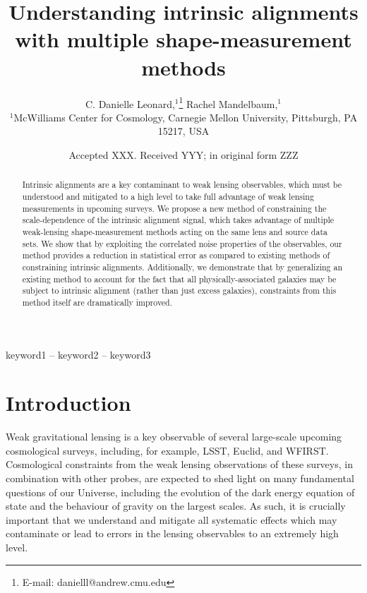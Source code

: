 \documentclass[a4paper,fleqn,usenatbib]{mnras}
\title[]{Understanding intrinsic alignments with multiple shape-measurement methods}
\author[C. D. Leonard et al.]{
C. Danielle Leonard,$^{1}$\thanks{E-mail: danielll@andrew.cmu.edu}
Rachel Mandelbaum,$^{1}$
\\
$^{1}$McWilliams Center for Cosmology, Carnegie Mellon University, Pittsburgh, PA 15217, USA
}
\date{Accepted XXX. Received YYY; in original form ZZZ}
\begin{document}
\label{firstpage}
\pagerange{\pageref{firstpage}--\pageref{lastpage}}
\maketitle

\begin{abstract}
Intrinsic alignments are a key contaminant to weak lensing observables, which must be understood and mitigated to a high level to take full advantage of weak lensing measurements in upcoming surveys. We propose a new method of constraining the scale-dependence of the intrinsic alignment signal, which takes advantage of multiple weak-lensing shape-measurement methods acting on the same lens and source data sets. We show that by exploiting the correlated noise properties of the observables, our method provides a reduction in statistical error as compared to existing methods of constraining intrinsic alignments. Additionally, we demonstrate that by generalizing an existing method to account for the fact that all physically-associated galaxies may be subject to intrinsic alignment (rather than just excess galaxies), constraints from this method itself are dramatically improved.
\end{abstract}

\begin{keywords}
keyword1 -- keyword2 -- keyword3
\end{keywords}



\section{Introduction}
\label{sec:introduction}
\noindent
Weak gravitational lensing is a key observable of several large-scale upcoming cosmological surveys, including, for example, LSST, Euclid, and WFIRST. Cosmological constraints from the weak lensing observations of these surveys, in combination with other probes, are expected to shed light on many fundamental questions of our Universe, including the evolution of the dark energy equation of state and the behaviour of gravity on the largest scales. As such, it is crucially important that we understand and mitigate all systematic effects which may contaminate or lead to errors in the lensing observables to an extremely high level.
\end{document}
